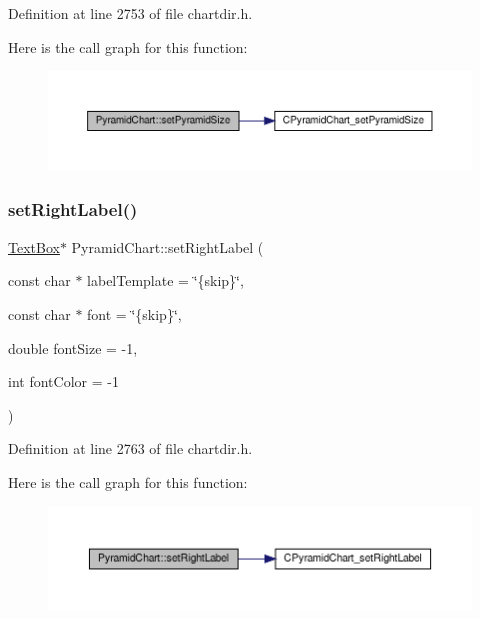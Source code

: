 Definition at line 2753 of file chartdir.\+h.

Here is the call graph for this function\+:
\nopagebreak
\begin{figure}[H]
\begin{center}
\leavevmode
\includegraphics[width=350pt]{class_pyramid_chart_ad2e427bdcbcf4a555c9e5143c12f36b1_cgraph}
\end{center}
\end{figure}
\mbox{\label{class_pyramid_chart_aee77f11172f6c4efa6d9715d43d05193}} 
\subsubsection{\texorpdfstring{set\+Right\+Label()}{setRightLabel()}}
{\footnotesize\ttfamily \hyperlink{class_text_box}{Text\+Box}$\ast$ Pyramid\+Chart\+::set\+Right\+Label (\begin{DoxyParamCaption}\item[{const char $\ast$}]{label\+Template = {\ttfamily \char`\"{}\{skip\}\char`\"{}},  }\item[{const char $\ast$}]{font = {\ttfamily \char`\"{}\{skip\}\char`\"{}},  }\item[{double}]{font\+Size = {\ttfamily -\/1},  }\item[{int}]{font\+Color = {\ttfamily -\/1} }\end{DoxyParamCaption})\hspace{0.3cm}{\ttfamily [inline]}}



Definition at line 2763 of file chartdir.\+h.

Here is the call graph for this function\+:
\nopagebreak
\begin{figure}[H]
\begin{center}
\leavevmode
\includegraphics[width=350pt]{class_pyramid_chart_aee77f11172f6c4efa6d9715d43d05193_cgraph}
\end{center}
\end{figure}
\mbox{\label{class_pyramid_chart_ac3dc9f4fac7f8ac89c6d2aa41af9542e}} 
